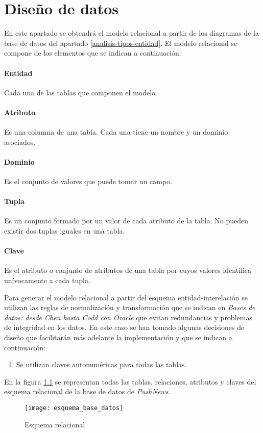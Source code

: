 \chapter{Diseño de datos}
En este apartado se obtendrá el modelo relacional a partir de los diagramas de la base de datos del apartado \ref{analisis-tipos-entidad}. El modelo relacional se compone de los elementos que se indican a continuación:

\subsubsection*{Entidad}
Cada una de las tablas que componen el modelo.

\subsubsection*{Atributo} Es una columna de una tabla. Cada una tiene un nombre y un dominio asociados.

\subsubsection*{Dominio}
Es el conjunto de valores que puede tomar un campo.

\subsubsection*{Tupla}
Es un conjunto formado por un valor de cada atributo de la tabla. No pueden existir dos tuplas iguales en una tabla.

\subsubsection*{Clave}
Es el atributo o conjunto de atributos de una tabla por cuyos valores identifica unívocamente a cada tupla.

Para generar el modelo relacional a partir del esquema entidad-interelación se utilizan las reglas de normalización y transformación que se indican en \textit{Bases de datos: desde Chen hasta Codd con Oracle} \cite{basesdedatos-rama} que evitan redundancias y problemas de integridad en los datos. En este caso se han tomado algunas decisiones de diseño que facilitarán más adelante la implementación y que se indican a continuación:

\begin{enumerate}
    \item Se utilizan claves autonuméricas para todas las tablas.
\end{enumerate}


En la figura \ref{fig:esquema-relacional} se representan todas las tablas, relaciones, atributos y claves del esquema relacional de la base de datos de \emph{PushNews}.

\begin{figure}[ht]
    \centering
    \texttt{[image: esquema\_base\_datos]}
    \caption{Esquema relacional}
    \label{fig:esquema-relacional}
\end{figure}
